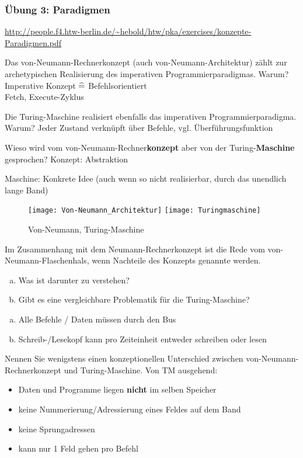 \begin{card}
	\frametitle{Übung 3: Paradigmen}
	\url{http://people.f4.htw-berlin.de/~hebold/htw/pka/exercises/konzepte-Paradigmen.pdf}
\end{card}

\begin{card}
	Das von-Neumann-Rechnerkonzept (auch von-Neumann-Architektur) zählt zur archetypischen Realisierung des imperativen Programmierparadigmas. Warum?
	\hr
	Imperative Konzept $\mathrel{\widehat{=}}$ Befehlsorientiert\\
	Fetch, Execute-Zyklus
\end{card}

\begin{card}
	Die Turing-Maschine realisiert ebenfalls das imperativen Programmierparadigma. Warum?
	\hr
	Jeder Zustand verknüpft über Befehle, vgl. Überführungsfunktion
\end{card}

\begin{card}
	Wieso wird vom von-Neumann-Rechner\textbf{konzept} aber von der Turing-\textbf{Maschine} gesprochen?
	\hr
	Konzept: Abstraktion
	
	Maschine: Konkrete Idee (auch wenn so nicht realisierbar, durch das unendlich lange Band)
	\begin{figure}[h]
	\centering
	\texttt{[image: Von-Neumann\_Architektur]}
	\texttt{[image: Turingmaschine]}
	\caption{Von-Neumann, Turing-Maschine}
	\end{figure}
\end{card}

\begin{card}
	Im Zusammenhang mit dem Neumann-Rechnerkonzept ist die Rede vom von-Neumann-Flaschenhals, wenn Nachteile des Konzepts genannte werden.
	\begin{enumerate}[a)]
	\item Was ist darunter zu verstehen?
	\item Gibt es eine vergleichbare Problematik für die Turing-Maschine? 
	\end{enumerate}
	\hr
	\begin{enumerate}[a)]
	\item Alle Befehle / Daten müssen durch den Bus
	\item Schreib-/Lesekopf kann pro Zeiteinheit entweder schreiben oder lesen
	\end{enumerate} 
\end{card}

\begin{card}
	Nennen Sie wenigstens einen konzeptionellen Unterschied zwischen von-Neumann-Rechnerkonzept und Turing-Maschine.
	\hr
	Von TM ausgehend:
	
	\begin{itemize}
	\item Daten und Programme liegen \textbf{nicht} im selben Speicher
	\item keine Nummerierung/Adressierung eines Feldes auf dem Band
	\item keine Sprungadressen
	\item kann nur 1 Feld gehen pro Befehl
	\end{itemize}
\end{card}

